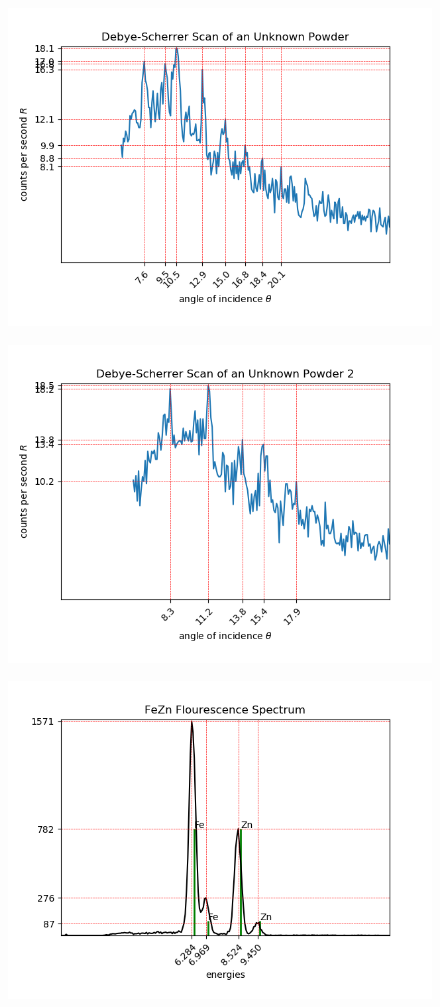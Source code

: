 \documentclass[8pt, a4paper]{article}
\begin{document}
\begin{figure}[h]
\includegraphics{ukp1}
\end{figure}

\begin{figure}[h]
\includegraphics{ukp2}
\end{figure}

\begin{figure}[h]
\includegraphics{fFeZn}
\end{figure}
\end{document}
